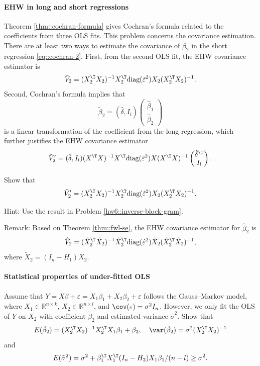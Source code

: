   \paragraph{EHW in long and short regressions}\label{hw08::ehw-long-short-ols}
Theorem \ref{thm::cochran-formula} gives Cochran's formula related to the coefficients from three OLS fits. 
This problem concerns the covariance estimation. 
There are at least two ways to estimate the covariance of $\tilde \beta_2$ in the short regression \eqref{eq::cochran-2}. First, from the second OLS fit, the EHW covariance estimator is
$$
\tilde V_2 = (X_2^{\T} X_2)^{-1}   X_2^{\T}  \text{diag}(\tilde \varepsilon^2)  X_2 (X_2^{\T} X_2)^{-1}.
$$
Second, Cochran's formula implies that 
$$
\tilde \beta_2 = (\hat \delta, I_l)  \begin{pmatrix}
\hat{\beta}_1 \\
\hat{\beta}_2
\end{pmatrix}
$$ is a linear transformation of the coefficient from the long regression, which further justifies the EHW covariance estimator 
$$
\tilde V_2 ' = (\hat \delta, I_l) (X^{\T} X)^{-1}   X^{\T}  \text{diag}(\hat \varepsilon^2)  X (X^{\T} X)^{-1}  \begin{pmatrix}
\hat \delta^{\T} \\
I_l
\end{pmatrix} .
$$

Show that 
$$
\tilde V_2 ' = (X_2^{\T} X_2)^{-1}   X_2^{\T}  \text{diag}(\hat \varepsilon^2)  X_2 (X_2^{\T} X_2)^{-1}.
$$


Hint: Use the result in Problem \ref{hw6::inverse-block-gram}. 

Remark: Based on Theorem \ref{thm::fwl-se}, the EHW covariance estimator for $\hat{\beta}_2$ is
$$
\hat{V}_2 = (\tilde X_2^{\T} \tilde X_2)^{-1}   \tilde X_2^{\T}  \text{diag}(\hat \varepsilon^2)  \tilde X_2 (\tilde X_2^{\T} \tilde X_2)^{-1},
$$
where $ \tilde X_2 = (I_n - H_1) X_2$. 

 
 
 \paragraph{Statistical properties of under-fitted OLS}
\label{hw::underfit-ols}


Assume that $Y = X \beta + \varepsilon = X_1 \beta_1 + X_2 \beta_2 + \varepsilon$ follows the Gauss--Markov model, where $X_1 \in \mathbb{R}^{n\times k}$, $X_2 \in \mathbb{R}^{n\times l}$, and $\cov(\varepsilon)=\sigma^2 I_n$. However, we only fit the OLS of $Y$ on $X_2$ with coefficient $\tilde{\beta}_2$ and estimated variance $\tilde{\sigma}^2$. Show that
$$
E(\tilde{\beta}_2) =  (X_2^{\T} X_2)^{-1} X_2^{\T} X_1 \beta_1 +   \beta_2 ,\quad
\var( \tilde{\beta}_2) = \sigma^2 (X_2^{\T} X_2)^{-1}
$$
and
$$
E(\tilde{\sigma}^2) = \sigma^2 + \beta_1^{\T} X_1^{\T} (I_n - H_2) X_1\beta_1/(n-l) \geq \sigma^2 . 
$$
 
 

